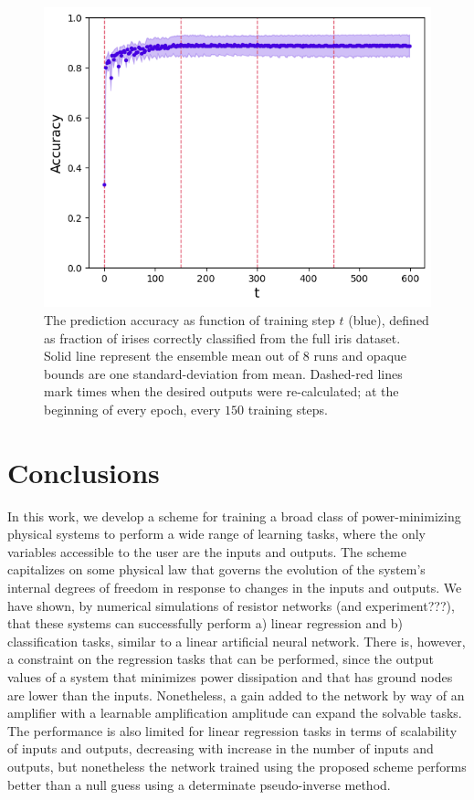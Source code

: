 \documentclass[%
 reprint,
 amsmath,amssymb,
 aps,
]{revtex4-2}
\begin{document}
    \begin{figure}[ht]
    \centerline{
    \includegraphics[width=\columnwidth]{Figures/accuracy_vs_t_markers.png}
    }
    \caption{The prediction accuracy as function of training step $t$ (blue), defined as fraction of irises correctly classified from the full iris dataset. Solid line represent the ensemble mean out of $8$ runs and opaque bounds are one standard-deviation from mean. Dashed-red lines mark times when the desired outputs were re-calculated; at the beginning of every epoch, every $150$ training steps.}
    \label{fig:accuracy_vs_t}
    \end{figure} 

\section*{Conclusions}\label{sec:conclusions}

    In this work, we develop a scheme for training a broad class of power-minimizing physical systems to perform a wide range of learning tasks, where the only variables accessible to the user are the inputs and outputs. The scheme capitalizes on some physical law that governs the evolution of the system’s internal degrees of freedom in response to changes in the inputs and outputs. 
    We have shown, by numerical simulations of resistor networks \textcolor{roie}{(and experiment???)}, that these systems can successfully perform a) linear regression and b) classification tasks, similar to a linear artificial neural network. There is, however, a constraint on the regression tasks that can be performed, since the output values of a system that minimizes power dissipation and that has ground nodes are lower than the inputs. Nonetheless, a gain added to the network by way of an amplifier with a learnable amplification amplitude can expand the solvable tasks. The performance is also limited for linear regression tasks in terms of scalability of inputs and outputs, decreasing with increase in the number of inputs and outputs, but nonetheless the network trained using the proposed scheme performs better than a null guess using a determinate pseudo-inverse method. 
    
\end{document}
